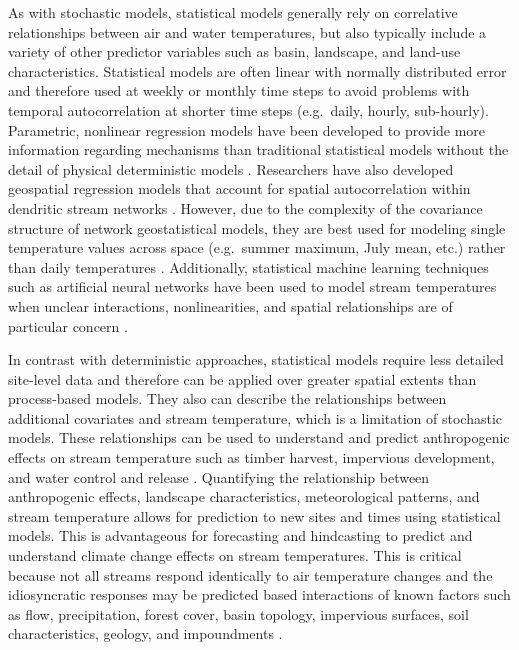 \documentclass[]{article}
\begin{document}
As with stochastic models, statistical models generally rely on
correlative relationships between air and water temperatures, but also
typically include a variety of other predictor variables such as basin,
landscape, and land-use characteristics. Statistical models are often
linear with normally distributed error and therefore used at weekly or
monthly time steps to avoid problems with temporal autocorrelation at
shorter time steps (e.g.~daily, hourly, sub-hourly). Parametric,
nonlinear regression models have been developed to provide more
information regarding mechanisms than traditional statistical models
without the detail of physical deterministic models \citep{Mohseni1998}.
Researchers have also developed geospatial regression models that
account for spatial autocorrelation within dendritic stream networks
\citep{Isaak2010b, Peterson2010, Peterson2013}. However, due to the
complexity of the covariance structure of network geostatistical models,
they are best used for modeling single temperature values across space
(e.g.~summer maximum, July mean, etc.) rather than daily temperatures
\citep{Peterson2010, Peterson2007, VerHoef2010}. Additionally,
statistical machine learning techniques such as artificial neural
networks have been used to model stream temperatures when unclear
interactions, nonlinearities, and spatial relationships are of
particular concern \citep{Sivri2009, Sivri2007, DeWeber2014}.

In contrast with deterministic approaches, statistical models require
less detailed site-level data and therefore can be applied over greater
spatial extents than process-based models. They also can describe the
relationships between additional covariates and stream temperature,
which is a limitation of stochastic models. These relationships can be
used to understand and predict anthropogenic effects on stream
temperature such as timber harvest, impervious development, and water
control and release \citep{Webb2008}. Quantifying the relationship
between anthropogenic effects, landscape characteristics, meteorological
patterns, and stream temperature allows for prediction to new sites and
times using statistical models. This is advantageous for forecasting and
hindcasting to predict and understand climate change effects on stream
temperatures. This is critical because not all streams respond
identically to air temperature changes and the idiosyncratic responses
may be predicted based interactions of known factors such as flow,
precipitation, forest cover, basin topology, impervious surfaces, soil
characteristics, geology, and impoundments \citep{Webb2008}.
\end{document}
